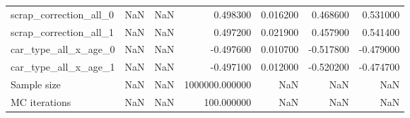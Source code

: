 \begin{tabular}{lrlrrrr}
scrap_correction_all_0 & NaN & NaN & 0.498300 & 0.016200 & 0.468600 & 0.531000 \\
scrap_correction_all_1 & NaN & NaN & 0.497200 & 0.021900 & 0.457900 & 0.541400 \\
car_type_all_x_age_0 & NaN & NaN & -0.497600 & 0.010700 & -0.517800 & -0.479000 \\
car_type_all_x_age_1 & NaN & NaN & -0.497100 & 0.012000 & -0.520200 & -0.474700 \\
Sample size & NaN & NaN & 1000000.000000 & NaN & NaN & NaN \\
MC iterations & NaN & NaN & 100.000000 & NaN & NaN & NaN \\
\bottomrule
\end{tabular}
